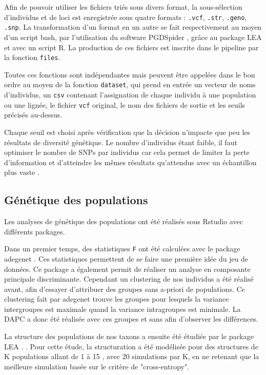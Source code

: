Afin de pouvoir utiliser les fichiers triés sous divers format, la sous-sélection d'individus et de loci est enregistrée sous quatre formats : \verb|.vcf|, \verb|.str|, \verb|.geno|, \verb|.snp|.
 La transformation d'un format en un autre se fait respectivement au moyen d'un script bash, par l'utilisation du software PGDSpider \citep{Lischer2012}, grâce au package LEA \citep{Frichot2015} et avec un script R.
 La production de ces fichiers est inscrite dans le pipeline par la fonction \verb|files|.

Toutes ces fonctions sont indépendantes mais peuvent être appelées dans le bon ordre au moyen de la fonction \verb|dataset|, qui prend en entrée un vecteur de noms d'individus, un \verb|csv| contenant l'assignation de chaque individu à une population ou une lignée, le fichier \verb|vcf| original, le nom des fichiers de sortie et les seuils précisés au-dessus.

Chaque seuil est choisi après vérification que la décision n'impacte que peu les résultats de diversité génétique.
 Le nombre d'individus étant faible, il faut optimiser le nombre de SNPs par individus car cela permet de limiter la perte d'information et d'atteindre les mêmes résultats qu'attendus avec un échantillon plus vaste \citep{Nazareno2017}.


\subsection{Génétique des populations}

Les analyses de génétique des populations ont été réalisés sous Rstudio \citep{RTeam2017} avec différents packages. 

Dans un premier temps, des statistiques \verb|F| ont été calculées avec le package adegenet \citep{Jombart2011}. Ces statistiques permettent de se faire une première idée du jeu de données.
 Ce package a également permit de réaliser un analyse en composante principale discriminante.
 Cependant un clustering de nos individus a été réalisé avant, afin d'essayer d'attribuer des groupes sans a-priori de populations.
 Ce clustering fait par adegenet trouve les groupes pour lesquels la variance intergroupes est maximale quand la variance intragroupes est minimale.
 La DAPC a donc été réalisée avec ces groupes et sans afin d'observer les différences.

La structure des populations de nos taxons a ensuite été étudiée par le package LEA \citep{Frichot2015}.
\DIFdelbegin {}\DIFdelend \DIFaddbegin {}\DIFaddend .
 Pour cette étude, la structuration a été modélisée pour des structures de K populations allant de 1 à 15 , avec 20 simulations par K, en ne retenant que la meilleure simulation basée sur le critère de "cross-entropy".
 
